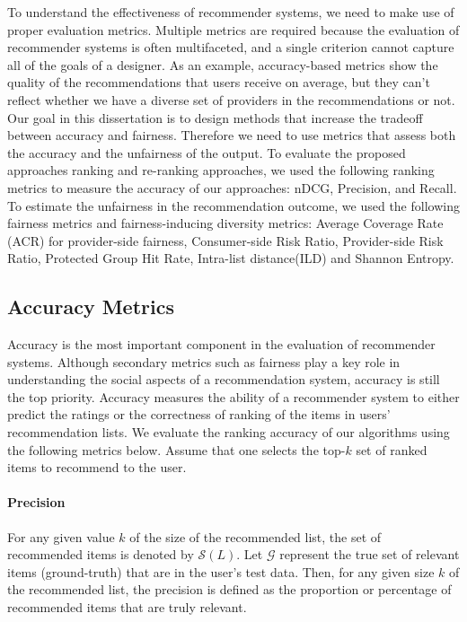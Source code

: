     To understand the effectiveness of recommender systems, we need to make use of proper evaluation metrics. Multiple metrics are required because the evaluation of recommender systems is often multifaceted, and a single criterion cannot capture all of the goals of a designer. As an example, accuracy-based metrics show the quality of the recommendations that users receive on average, but they can't reflect whether we have a diverse set of providers in the recommendations or not. Our goal in this dissertation is to design methods that increase the tradeoff between accuracy and fairness. Therefore we need to use metrics that assess both the accuracy and the unfairness of the output. To evaluate the proposed approaches ranking and re-ranking approaches, we used the following ranking metrics to measure the accuracy of our approaches: nDCG, Precision, and Recall. To estimate the unfairness in the recommendation outcome, we used the following fairness metrics and fairness-inducing diversity metrics: Average Coverage Rate (ACR) for provider-side fairness, Consumer-side Risk Ratio, Provider-side Risk Ratio, Protected Group Hit Rate, Intra-list distance(ILD) and Shannon Entropy.
    
    
    \subsection{Accuracy Metrics}
    
        Accuracy is the most important component in the evaluation of recommender systems. Although secondary metrics such as fairness play a key role in understanding the social aspects of a recommendation system, accuracy is still the top priority. Accuracy measures the ability of a recommender system to either predict the ratings or the correctness of ranking of the items in users' recommendation lists. We evaluate the ranking accuracy of our algorithms using the following metrics below. Assume that one selects the top-$k$ set of ranked items to recommend to the user.
    
        \vspace{0.25cm}
        \noindent \paragraph{Precision}
        \vspace{0.25cm}
        
            For any given value $k$ of the size of the recommended list, the set of recommended items is denoted by $\mathcal{S}(L)$. Let $\mathcal{G}$ represent the true set of relevant items (ground-truth) that are in the user's test data. Then, for any given size $k$ of the recommended list, the precision is defined as the proportion or percentage of recommended items that are truly relevant. %
            
